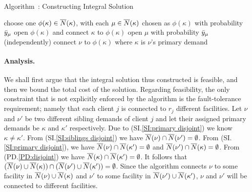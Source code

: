 
\begin{algorithm}
  \caption{Algorithm~{\ECHS}:
    Constructing Integral Solution}
  \label{alg:lpr3}
  \begin{algorithmic}[1]
    \State choose one $\phi(\kappa)\in {\overline{N}}(\kappa)$,
    with each $\mu\in{\overline{N}}(\kappa)$ chosen as $\phi(\kappa)$
    with probability ${\bar y}_\mu$
    \State open $\phi(\kappa)$ and connect $\kappa$ to $\phi(\kappa)$
    \EndFor
    \State open $\mu$ with probability ${\bar y}_\mu$ (independently)
    \EndFor
    \Else
    \State connect $\nu$ to $\phi(\kappa)$ where $\kappa$ is $\nu$'s
     primary demand
    \EndIf
    \EndFor
  \end{algorithmic}
\end{algorithm}


\paragraph{Analysis.}
We shall first argue that the integral solution thus
constructed is feasible, and then we bound the total cost of
the solution. Regarding feasibility, the only constraint
that is not explicitly enforced by the algorithm is the
fault-tolerance requirement; namely that each client $j$ is
connected to $r_j$ different facilities. Let $\nu$ and
$\nu'$ be two different sibling demands of client $j$ and let
their assigned primary demands be $\kappa$ and $\kappa'$
respectively. Due to (SI.\ref{SI:primary
  disjoint}) we know $\kappa \neq \kappa'$. From
(SI.\ref{SI:siblings disjoint}) we have ${\overline{N}}(\nu) \cap
{\overline{N}}(\nu') = \emptyset$. From (SI.\ref{SI:primary
  disjoint}), we have ${\overline{N}}(\nu) \cap {\overline{N}}(\kappa') =
\emptyset$ and ${\overline{N}}(\nu') \cap {\overline{N}}(\kappa) =
\emptyset$. From (PD.\ref{PD:disjoint}) we have
${\overline{N}}(\kappa)\cap {\overline{N}}(\kappa') = \emptyset$. It follows
that $({\overline{N}}(\nu) \cup {\overline{N}}(\kappa)) \cap ({\overline{N}}(\nu')
\cup {\overline{N}}(\kappa')) = \emptyset$. Since the algorithm
connects $\nu$ to some facility in ${\overline{N}}(\nu) \cup
{\overline{N}}(\kappa)$ and $\nu'$ to some facility in ${\overline{N}}(\nu')
\cup {\overline{N}}(\kappa')$, $\nu$ and $\nu'$ will be connected to
different facilities.


